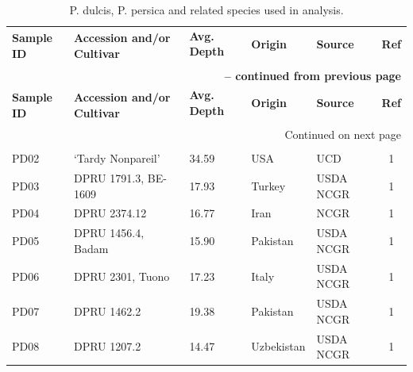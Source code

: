 \documentclass[12pt]{article}
\begin{document}
\begin{center}
\begin{longtable}{lllllc}
\caption{P. dulcis, P. persica and related species used in analysis.} \label{sampledetails} \\
\hline \hline
\multicolumn{1}{l}{\multirow{2}{1.5cm}{\textbf{Sample ID}}} &
\multicolumn{1}{l}{\multirow{2}{4cm}{\textbf{Accession and/or Cultivar}}} &
\multicolumn{1}{l}{\textbf{Avg. Depth}} &
\multicolumn{1}{l}{\textbf{Origin}} &
\multicolumn{1}{l}{\textbf{Source}} &
\multicolumn{1}{c}{\textbf{Ref}}\\ \\
\hline 
\endfirsthead

\multicolumn{6}{r}{{\bfseries \tablename\ \thetable{} -- continued from previous page}} \\
\hline 
\multicolumn{1}{l}{\multirow{2}{1.5cm}{\textbf{Sample ID}}} &
\multicolumn{1}{l}{\multirow{2}{4cm}{\textbf{Accession and/or Cultivar}}} &
\multicolumn{1}{l}{\textbf{Avg. Depth}} &
\multicolumn{1}{l}{\textbf{Origin}} &
\multicolumn{1}{l}{\textbf{Source}} &
\multicolumn{1}{c}{\textbf{Ref}} \\ \\ \hline 
\endhead
%
\hline \multicolumn{6}{r}{{Continued on next page}} \\ \hline \hline
\endfoot
%
\endlastfoot
%
	\multicolumn{6}{l}{\emph{P. dulcis}}  \\
	PD02 &‘Tardy Nonpareil’ &34.59 &USA &UCD &1\\
	PD03 &DPRU 1791.3, BE-1609 &17.93 &Turkey &USDA NCGR &1\\
	PD04 &DPRU 2374.12 &16.77 &Iran &NCGR &1\\
	PD05 &DPRU 1456.4, Badam &15.90 &Pakistan &USDA NCGR &1\\
	PD06 &DPRU 2301, Tuono &17.23 &Italy &USDA NCGR &1\\
	PD07 &DPRU 1462.2 &19.38 &Pakistan &USDA NCGR &1\\
	PD08 &DPRU 1207.2 &14.47 &Uzbekistan &USDA NCGR &1\\

\end{longtable}
\end{center}
\end{document}
